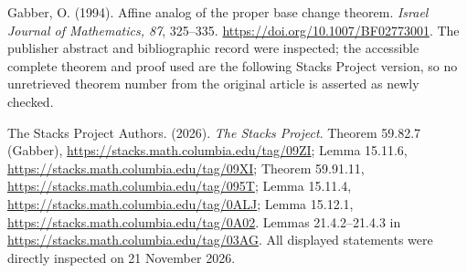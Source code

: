 Gabber, O. (1994). Affine analog of the proper base change theorem.
\emph{Israel Journal of Mathematics, 87}, 325--335.
\url{https://doi.org/10.1007/BF02773001}.
The publisher abstract and bibliographic record were inspected;
the accessible complete theorem and proof used are the following
Stacks Project version, so no unretrieved theorem number from the
original article is asserted as newly checked.

The Stacks Project Authors. (2026). \emph{The Stacks Project}.
Theorem 59.82.7 (Gabber), \url{https://stacks.math.columbia.edu/tag/09ZI};
Lemma 15.11.6, \url{https://stacks.math.columbia.edu/tag/09XI};
Theorem 59.91.11, \url{https://stacks.math.columbia.edu/tag/095T};
Lemma 15.11.4, \url{https://stacks.math.columbia.edu/tag/0ALJ};
Lemma 15.12.1, \url{https://stacks.math.columbia.edu/tag/0A02}.
Lemmas 21.4.2--21.4.3 in \url{https://stacks.math.columbia.edu/tag/03AG}.
All displayed statements were directly inspected on 21 November 2026.
